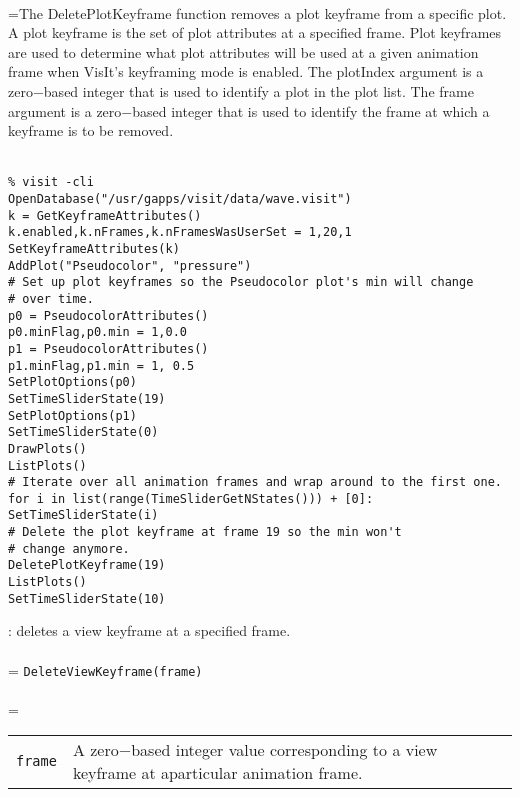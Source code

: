 \documentclass[10pt,a4paper]{report}
\begin{document}
 \\ 
\hangindent=\parindent The DeletePlotKeyframe function removes a plot keyframe from a specific plot. A plot keyframe is the set of plot attributes at a specified frame. Plot keyframes are used to determine what plot attributes will be used at a given animation frame when VisIt's keyframing mode is enabled. The plotIndex argument is a zero$-$based integer that is used to identify a plot in the plot list. The frame argument is a zero$-$based integer that is used to identify the frame at which a keyframe is to be removed. \\[-3mm] 

\\[-6mm]
\begin{verbatim}% visit -cli
OpenDatabase("/usr/gapps/visit/data/wave.visit")
k = GetKeyframeAttributes()
k.enabled,k.nFrames,k.nFramesWasUserSet = 1,20,1
SetKeyframeAttributes(k)
AddPlot("Pseudocolor", "pressure")
# Set up plot keyframes so the Pseudocolor plot's min will change
# over time.
p0 = PseudocolorAttributes()
p0.minFlag,p0.min = 1,0.0
p1 = PseudocolorAttributes()
p1.minFlag,p1.min = 1, 0.5
SetPlotOptions(p0)
SetTimeSliderState(19)
SetPlotOptions(p1)
SetTimeSliderState(0)
DrawPlots()
ListPlots()
# Iterate over all animation frames and wrap around to the first one.
for i in list(range(TimeSliderGetNStates())) + [0]:
SetTimeSliderState(i)
# Delete the plot keyframe at frame 19 so the min won't 
# change anymore.
DeletePlotKeyframe(19)
ListPlots()
SetTimeSliderState(10)
\end{verbatim}
\newpage


{}
: deletes a view keyframe at a specified frame.\\[-3mm]

 \\ 
\hangindent=\parindent 
\verb!DeleteViewKeyframe(frame)!\\ [-3mm]

 \\ 
\hangindent=\parindent 
\begin{tabular}{lp{9cm}}
\verb!frame! & A zero$-$based integer value corresponding to a view keyframe at aparticular animation frame. \\
\end{tabular} \\[-2mm]
\end{document}
